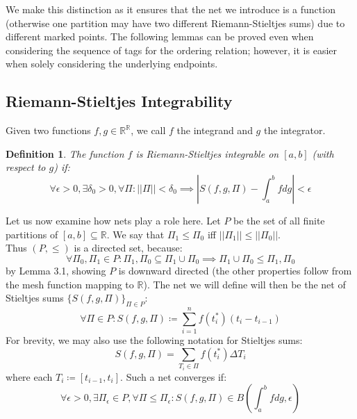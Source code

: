 \documentclass[10pt,letterpaper]{article} %
\newtheorem{defn}{Definition}[section]
\begin{document}
We make this distinction as it ensures that the net we introduce is a function (otherwise one partition may have two different Riemann-Stieltjes sums) due to different marked points. The following lemmas can be proved even when considering the sequence of tags for the ordering relation; however, it is easier when solely considering the underlying endpoints.

\subsection{Riemann-Stieltjes Integrability}
Given two functions $f, g \in \mathbb{R}^\mathbb{R}$, we call $f$ the integrand and $g$ the integrator.
\begin{defn}
The function $f$ is Riemann-Stieltjes integrable on $[a, b]$ (with respect to $g$) if:
\begin{equation*}
\forall \epsilon > 0, \exists \delta_0 > 0, \forall \Pi: ||\Pi|| < \delta_0 \implies \left|S(f, g, \Pi) - \int_{a}^{b}fdg\right| < \epsilon
\end{equation*}
\end{defn}
Let us now examine how nets play a role here. Let $P$ be the set of all finite partitions of $[a, b] \subseteq \mathbb{R}$. We say that $\Pi_1 \leq \Pi_0$ iff $||\Pi_1|| \leqslant ||\Pi_0||$.\\

Thus $(P, \leq)$ is a directed set, because:
\begin{equation*}
\forall \Pi_0, \Pi_1 \in P: \Pi_1, \Pi_0 \subseteq \Pi_1 \cup \Pi_0 \implies \Pi_1 \cup \Pi_0 \leq \Pi_1, \Pi_0
\end{equation*}
by Lemma 3.1, showing $P$ is downward directed (the other properties follow from the mesh function mapping to $\mathbb{R}$). The net we will define will then be the net of Stieltjes sums $\{S(f, g, \Pi)\}_{\Pi \in P}$:
\begin{equation*}
\forall \Pi \in P: S(f, g, \Pi) \coloneq \sum_{i=1}^{n}f(t_i^*)(t_i - t_{i-1})
\end{equation*}
For brevity, we may also use the following notation for Stieltjes sums:
\begin{equation*}
S(f, g, \Pi) = \sum_{T_i \in \Pi}f(t_i^*)\Delta T_i
\end{equation*}
where each $T_i \coloneq [t_{i-1}, t_i]$. Such a net converges if:
\begin{equation*}
\forall \epsilon > 0, \exists \Pi_\epsilon \in P, \forall \Pi \leq \Pi_\epsilon: S(f, g, \Pi) \in B\left(\int_{a}^{b}fdg, \epsilon \right)
\end{equation*}
\end{document}
